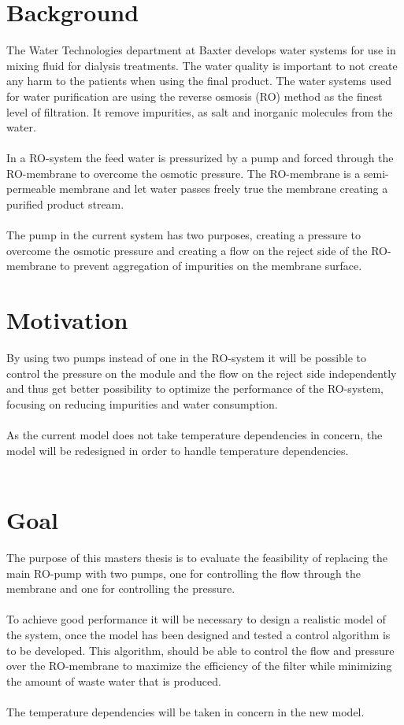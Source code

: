 
\section{Background}

The Water Technologies department at Baxter develops water systems for use in mixing fluid for dialysis treatments. The water quality is important to not create any harm to the patients when using the final product. The water systems used for water purification are using the reverse osmosis (RO) method as the finest level of filtration. It remove impurities, as salt and inorganic molecules from the water\cite{Dow}.\\
\\
In a RO-system the feed water is pressurized by a pump and forced through the RO-membrane to overcome the osmotic pressure. The RO-membrane is a semi-permeable membrane and let water passes freely true the membrane creating a purified product stream. \\
\\
The pump in the current system has two purposes, creating a pressure to overcome the osmotic pressure and creating a flow on the reject side of the RO-membrane to prevent aggregation of impurities on the membrane surface.\\



\section{Motivation}
By using two pumps instead of one in the RO-system it will be possible to control the pressure on the module and the flow on the reject side independently and thus get better possibility to optimize the performance of the RO-system, focusing on reducing impurities and water consumption. \\
\\
As the current model does not take temperature dependencies in concern, the model will be redesigned in order to handle temperature dependencies.  \\
\\
\section{Goal}
The purpose of this masters thesis is to evaluate the feasibility of replacing the main RO-pump with two pumps, one for controlling the flow through the membrane and one for controlling the pressure. \\
\\
To achieve good performance it will be necessary to design a realistic model of the system, once the model has been designed and tested a control algorithm is to be developed. This algorithm, should be able to control the flow and pressure over the RO-membrane to maximize the efficiency of the filter while minimizing the amount of waste water that is produced. \\
\\
The temperature dependencies will be taken in concern in the new model.


